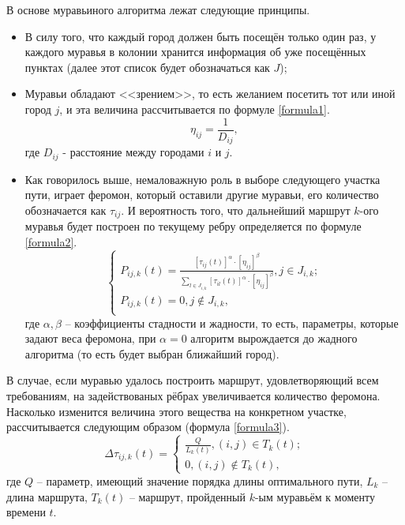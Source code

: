 В основе муравьиного алгоритма лежат следующие принципы.
\begin{itemize}
	\item В силу того, что каждый город должен быть посещён только один раз, у каждого муравья в колонии хранится информация об уже посещённых пунктах (далее этот список будет обозначаться как $J$);
	
	\item Муравьи обладают <<зрением>>, то есть желанием посетить тот или иной город $j$, и эта величина рассчитывается по формуле \ref{formula1}.
	\begin{equation}\label{formula1}
			\eta_{ij} = \frac{1}{D_{ij}},
		\end{equation}
	где $D_{ij}$ - расстояние между городами $i$ и $j$.
	
	\item Как говорилось выше, немаловажную роль в выборе следующего участка пути, играет феромон, который оставили другие муравьи, его количество обозначается как $\tau_{ij}$. И вероятность того, что дальнейший маршрут $k$-ого муравья будет построен по текущему ребру определяется по формуле \ref{formula2}.
	\begin{equation}\label{formula2}
		\left\{
			\begin{array}{ccc}
				P_{ij, k}(t) = \frac{[\tau_{ij}(t)]^\alpha \cdot [\eta_{ij} ]^\beta}{ \sum\limits_{l \in J_{i, k}} [\tau_{il}(t)]^\alpha \cdot [\eta_{ij}] ^\beta}, j \in J_{i, k};\\
				P_{ij, k}(t) = 0, j \notin J_{i, k}, \\
			\end{array}
		\right.
	\end{equation}
	где $\alpha, \beta$ -- коэффициенты стадности и жадности, то есть, параметры, которые задают веса феромона, при $\alpha = 0$ алгоритм вырождается до жадного алгоритма (то есть будет выбран ближайший город).
	\end{itemize}

В случае, если муравью удалось построить маршрут, удовлетворяющий всем требованиям, на задействованых рёбрах увеличивается количество феромона. Насколько изменится величина этого вещества на конкретном участке, рассчитывается следующим образом (формула \ref{formula3}).
\begin{equation}\label{formula3}
		\Delta \tau_{ij, k}(t) = \left\{
			\begin{array}{ccc}
				\frac{Q}{L_{k}(t)}, (i, j) \in T_{k}(t); \\
				0, (i, j) \notin T_{k}(t),
			\end{array}
		\right.
\end{equation}
где $Q$ -- параметр, имеющий значение порядка длины оптимального пути, $L_k$ -- длина маршрута, $T_k(t)$ -- маршрут, пройденный $k$-ым муравьём к моменту времени $t$.\\

